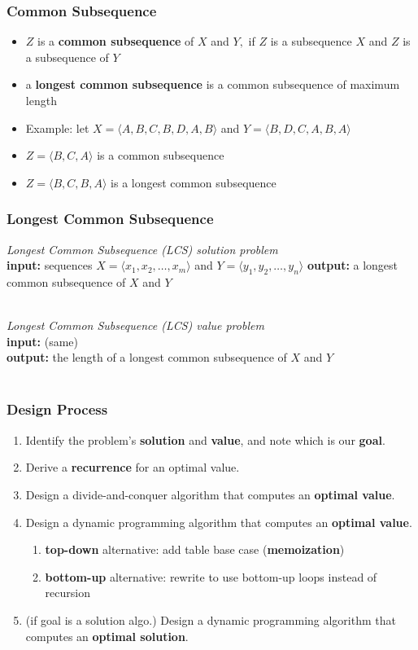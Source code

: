 \documentclass{beamer}
\newcommand{\stanza}{ \\~\ }
\begin{document}
\begin{frame} \frametitle{Common Subsequence}
  \begin{itemize}
  \item $Z$ is a \textbf{common subsequence} of $X$ and $Y,$ if $Z$ is a subsequence $X$ and $Z$ is a subsequence of $Y$
  \item a \textbf{longest common subsequence} is a common subsequence of maximum length
  \item Example: let $X=\langle A, B, C, B, D, A, B \rangle $  and $Y=\langle B, D, C, A, B, A \rangle$ 
  \item $Z=\langle B, C, A \rangle$ is a common subsequence
  \item $Z=\langle B, C, B, A \rangle$ is a longest common subsequence
  \end{itemize}
\end{frame}

\begin{frame} \frametitle{Longest Common Subsequence}

  \emph{Longest Common Subsequence (LCS) solution problem} \\
  \textbf{input:} sequences $X=\langle x_1, x_2, \ldots, x_m \rangle$ and $Y=\langle y_1, y_2, \ldots, y_n \rangle$
  \textbf{output:} a longest common subsequence of $X$ and $Y$ \stanza
  
  \emph{Longest Common Subsequence (LCS) value problem} \\
  \textbf{input:} (same) \\
  \textbf{output:} the length of a longest common subsequence of $X$ and $Y$ \stanza

\end{frame}

\begin{frame} \frametitle{Design Process}
  \begin{enumerate}
    \item Identify the problem's \textbf{solution} and \textbf{value}, and note which is our \textbf{goal}.
    \item Derive a \textbf{recurrence} for an optimal value.
    \item Design a divide-and-conquer algorithm that computes an \textbf{optimal value}.
    \item Design a dynamic programming algorithm that computes an \textbf{optimal value}.
    \begin{enumerate}
      \item \textbf{top-down} alternative: add table base case (\textbf{memoization})
      \item \textbf{bottom-up} alternative: rewrite to use bottom-up loops instead of recursion
    \end{enumerate}
    \item (if goal is a solution algo.) Design a dynamic programming algorithm that computes an \textbf{optimal solution}.
  \end{enumerate}
  \end{frame}
\end{document}
